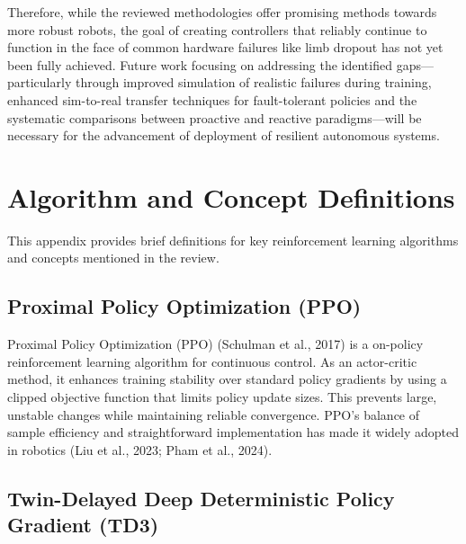 \documentclass[12pt, a4paper]{article} %
\begin{document}
\noindent
Therefore, while the reviewed methodologies offer promising methods towards more robust robots, the goal of creating controllers that reliably continue to function in the face of common hardware failures like limb dropout has not yet been fully achieved. Future work focusing on addressing the identified gaps—particularly through improved simulation of realistic failures during training, enhanced sim-to-real transfer techniques for fault-tolerant policies and the systematic comparisons between proactive and reactive paradigms—will be necessary for the advancement of deployment of resilient autonomous systems.
\newpage %

\appendix %
\section{Algorithm and Concept Definitions}
\label{app:definitions}
This appendix provides brief definitions for key reinforcement learning algorithms and concepts mentioned in the review.

\subsection{Proximal Policy Optimization (PPO)}
\label{def:ppo}

Proximal Policy Optimization (PPO) (Schulman et al., 2017) is a on-policy reinforcement learning algorithm for continuous control. As an actor-critic method, it enhances training stability over standard policy gradients by using a clipped objective function that limits policy update sizes. This prevents large, unstable changes while maintaining reliable convergence. PPO's balance of sample efficiency and straightforward implementation has made it widely adopted in robotics (Liu et al., 2023; Pham et al., 2024).
\subsection{Twin-Delayed Deep Deterministic Policy Gradient (TD3)}
\label{def:td3}
\end{document}
